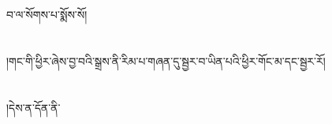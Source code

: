 བ་ལ་སོགས་པ་སྨོས་སོ།\chapter{ }།གང་གི་ཕྱིར་ཞེས་བྱ་བའི་སྒྲས་ནི་རིམ་པ་གཞན་དུ་སྦྱར་བ་ཡིན་པའི་ཕྱིར་གོང་མ་དང་སྦྱར་རོ།\chapter{ }།དེས་ན་དོན་ནི་